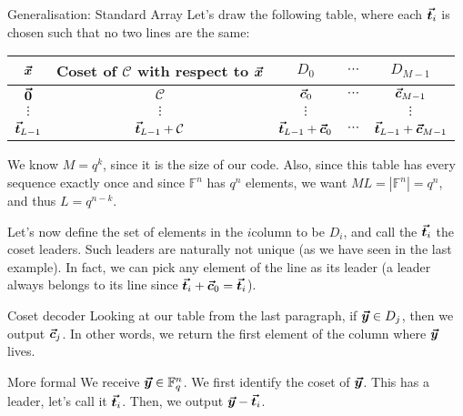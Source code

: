 \documentclass[a4paper]{article}
\begin{document}
\begin{parag}{Generalisation: Standard Array}
    Let's draw the following table, where each $\bm{\protect\vec{t}}_i$ is chosen such that no two lines are the same:
    \begin{center}
    \begin{tabular}{c|c|ccc}
        $\bm{\protect\vec{x}}$ & Coset of $\mathcal{C}$ with respect to $\bm{\protect\vec{x}}$ & $D_0$ & $\cdots$ & $D_{M-1}$\\
        \hline
        $\bm{\protect\vec{0}}$ & $\mathcal{C}$ & $\bm{\protect\vec{c}}_0$ & $\cdots$ & $\bm{\protect\vec{c}}_{M-1}$ \\
        $\vdots$ & $\vdots$ & $\vdots$ & & $\vdots$ \\
        $\bm{\protect\vec{t}}_{L-1}$ & $\bm{\protect\vec{t}}_{L-1} + \mathcal{C}$ & $\bm{\protect\vec{t}}_{L-1} + \bm{\protect\vec{c}}_0$ & $\cdots$ & $\bm{\protect\vec{t}}_{L-1} + \bm{\protect\vec{c}}_{M-1}$
    \end{tabular}
    \end{center}

    We know $M = q^k$, since it is the size of our code. Also, since this table has every sequence exactly once and since $\mathbb{F}^n$ has $q^n$ elements, we want $ML = \left|\mathbb{F}^n\right| = q^n$, and thus $L = q^{n-k}$.

    Let's now define the set of elements in the $i$\Th column to be $D_i$, and call the $\bm{\protect\vec{t}}_i$ the coset leaders. Such leaders are naturally not unique (as we have seen in the last example). In fact, we can pick any element of the line as its leader (a leader always belongs to its line since $\bm{\protect\vec{t}}_i + \bm{\protect\vec{c}}_0 = \bm{\protect\vec{t}}_i$).
\end{parag}

\begin{parag}{Coset decoder}
    Looking at our table from the last paragraph, if $\bm{\protect\vec{y}} \in D_j$, then we output $\bm{\protect\vec{c}}_j$. In other words, we return the first element of the column where $\bm{\protect\vec{y}}$ lives.

    \begin{subparag}{More formal}
        We receive $\bm{\protect\vec{y}} \in \mathbb{F}_q^n$. We first identify the coset of $\bm{\protect\vec{y}}$. This has a leader, let's call it $\bm{\protect\vec{t}}_i$. Then, we output $\bm{\protect\vec{y}} - \bm{\protect\vec{t}}_i$.
    \end{subparag}
\end{parag}
\end{document}
